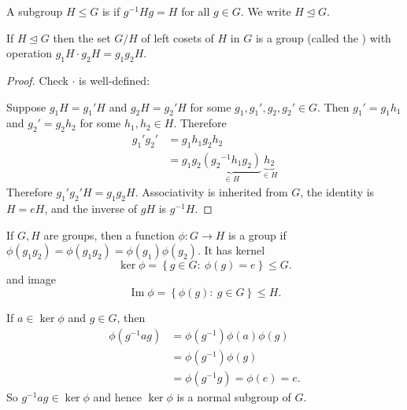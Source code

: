 \documentclass[egregdoesnotlikesansseriftitles,a4paper]{scrartcl}
\begin{document}
\begin{definition*}
     A subgroup $H \leq G$ is  if ${g}^{-1}Hg=H$ for all $g \in G$. We write $H \unlhd G$.
\end{definition*}
\begin{proposition}
     If $H \unlhd G$ then the set $G/H$ of left cosets of $H$ in $G$ is a group (called the ) with operation $g_1 H \cdot g_2 H= g_1 g_2 H.$
     \begin{proof}
      Check $\cdot $ is well-defined:
 
      Suppose $g_1 H=g_1 ' H$ and $g_2 H= g_2 ' H$ for some $g_1 , g_1 ',g_2 , g_2' \in G$. Then $g_1 ' =g_1 h_1 $ and $g_2 '=g_2 h_2 $ for some $h_1 , h_2 \in H$. Therefore 
      \begin{align*}
          g_1 ' g_2 ' &=g_1 h_1 g_2 h_2 \\
          &=g_1 g_2 \underbrace{({g_2 }^{-1}h_1 g_2 )}_{\in H} \underbrace{ h_2}_{\in H} 
      \end{align*}  
      Therefore $g_1 ' g_2 ' H=g_1 g_2 H$.
      Associativity is inherited from $G$, the identity is $H=eH$, and the inverse of $gH$ is ${g}^{-1}H$.
 \end{proof}
\end{proposition}
\begin{definition*}[Homomorphism]
     If $G,H$ are groups, then a function $\phi: G \rightarrow H$ is a group  if $\phi (g_1 g_2)=\phi (g_1 g_2 )=\phi (g_1 )\phi (g_2 )$. It has kernel \[
     \operatorname{ker} \phi= \left\{g \in G: \ \phi (g)=e\right\} \leq G
     .\]  and image \[
     \operatorname{Im} \phi = \left\{\phi (g): \ g \in G \right\} \leq H
     .\] 
\end{definition*}
\begin{remark}
     If $a \in \operatorname{ker}\phi$ and $g \in G$, then 
     \begin{align*}
         \phi ({g}^{-1}ag)&=\phi ({g}^{-1}) \phi (a) \phi (g)\\
         &=\phi ({g}^{-1}) \phi (g)\\
         &= \phi ({g}^{-1}g)=\phi (e)=e.
     \end{align*}
     So ${g}^{-1}ag \in \operatorname{ker}\phi$ and hence $\operatorname{ker}\phi$ is a normal subgroup of $G$.
\end{remark}
\end{document}
